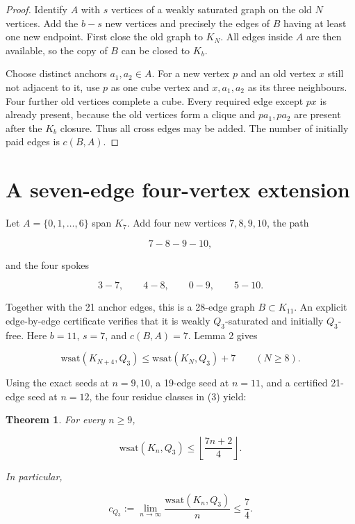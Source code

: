 \documentclass[11pt]{article}
\newtheorem{theorem}{Theorem}
\numberwithin{equation}{section}
\begin{document}
\begin{proof}


Identify $A$ with $s$ vertices of a weakly saturated graph on the old $N$ vertices. Add the
$b-s$ new vertices and precisely the edges of $B$ having at least one new endpoint. First close the
old graph to $K_N$. All edges inside $A$ are then available, so the copy of $B$ can be closed to
$K_b$.

Choose distinct anchors $a_1,a_2\in A$. For a new vertex $p$ and an old vertex $x$ still not
adjacent to it, use $p$ as one cube vertex and $x,a_1,a_2$ as its three neighbours. Four further
old vertices complete a cube. Every required edge except $px$ is already present, because the old
vertices form a clique and $pa_1,pa_2$ are present after the $K_b$ closure. Thus all cross edges
may be added. The number of initially paid edges is $c(B,A)$.
\end{proof}


\section{A seven-edge four-vertex extension}


Let $A=\{0,1,\ldots,6\}$ span $K_7$. Add four new vertices $7,8,9,10$, the path

\[
7-8-9-10,
\]

and the four spokes

\[
3-7,\qquad4-8,\qquad0-9,\qquad5-10.
\]

Together with the 21 anchor edges, this is a 28-edge graph $B\subset K_{11}$. An explicit
edge-by-edge certificate verifies that it is weakly $Q_3$-saturated and initially $Q_3$-free.
Here $b=11$, $s=7$, and $c(B,A)=7$. Lemma 2 gives

\[
\mathrm{wsat}(K_{N+4},Q_3)
\leq\mathrm{wsat}(K_N,Q_3)+7
\qquad(N\geq8).
\tag{3}
\]

Using the exact seeds at $n=9,10$, a 19-edge seed at $n=11$, and a certified 21-edge seed at
$n=12$, the four residue classes in (3) yield:

\begin{theorem}


For every $n\geq9$,

\[
\mathrm{wsat}(K_n,Q_3)
\leq\left\lfloor\frac{7n+2}{4}\right\rfloor.
\tag{4}
\]

In particular,

\[
c_{Q_3}:=\lim_{n\to\infty}\frac{\mathrm{wsat}(K_n,Q_3)}n\leq\frac74.
\]

\end{theorem}
\end{document}

